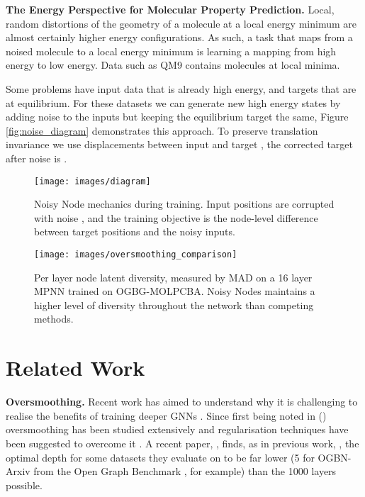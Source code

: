 \documentclass{article} \usepackage{iclr2022_conference,times}
\begin{document}
\textbf{The Energy Perspective for Molecular Property Prediction.} Local, random distortions of the geometry of a molecule at a local energy minimum are almost certainly higher energy configurations. As such, a task that maps from a noised molecule to a local energy minimum is learning a mapping from high energy to low energy. Data such as QM9 contains molecules at local minima.

Some problems have input data that is already high energy, and targets that are at equilibrium. For these datasets we can generate new high energy states by adding noise to the inputs but keeping the equilibrium target the same,  Figure \ref{fig:noise_diagram} demonstrates this approach. To preserve translation invariance we use displacements between input and target , the corrected target after noise is .

\begin{figure}[]
    \centering
    \begin{minipage}{0.4\textwidth}
        \centering
        \texttt{[image: images/diagram]}
        \setlength{\belowcaptionskip}{-20pt}
        \caption{Noisy Node mechanics during training. Input positions are corrupted with noise , and the training objective is the node-level difference between target positions and the noisy inputs.}
        \label{fig:noise_diagram}
    \end{minipage}\hfill
    \begin{minipage}{0.5\textwidth}
        \centering
        \texttt{[image: images/oversmoothing\_comparison]}
        \setlength{\belowcaptionskip}{-20pt}
        \caption{Per layer node latent diversity, measured by MAD on a 16 layer MPNN trained on OGBG-MOLPCBA. Noisy Nodes maintains a higher level of diversity throughout the network than competing methods.}
    \label{fig:mad_chart}
    \end{minipage}
    
\end{figure}

\section{Related Work}



\textbf{Oversmoothing.} Recent work has aimed to understand why it is challenging to realise the benefits of training deeper GNNs \citep{wu2020comprehensive}. Since first being noted in (\citep{li2018deeper}) oversmoothing has been studied extensively and regularisation techniques have been suggested to overcome it \citep{Chen2019Oversmoothing, Cai2020Oversmoothing, RongDropEdge2019, ZhouNodeNorm2020, yang2020revisiting, Do2021GraphCN, Zhao2020PairNormTO}. A recent paper, \citep{Li1000Layers2021}, finds, as in previous work, \citep{Li2019DeepGCNsCG, Li2020DeeperGCNAY}, the optimal depth for some datasets they evaluate on to be far lower (5 for OGBN-Arxiv from the Open Graph Benchmark \citep{Hu2020OpenGB}, for example) than the 1000 layers possible.
\end{document}
